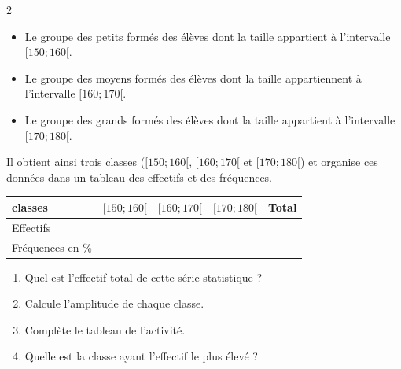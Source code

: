 \begin{multicols*}{2}
 	\begin{itemize}
 		\item Le groupe des petits formés des élèves dont la taille appartient à l'intervalle $[150; 160[$.
 		\item Le groupe des moyens formés des élèves dont la taille appartiennent à l'intervalle $[160; 170[$.
 		\item Le groupe des grands formés des élèves dont la taille appartient à l'intervalle $[170; 180[$.
 	\end{itemize}Il obtient ainsi trois classes ($[150; 160[$, $[160; 170[$ et $[170; 180[$) et organise ces données dans un tableau des effectifs et des fréquences.\\
 	\renewcommand{\arraystretch}{1.5}
 	
 	\hspace*{-1cm}\begin{tabular}{|p{1.7cm}|c|c|c|c|}
 		\hline
 		classes & $[150; 160[$ & $[160;170[$ & $[170; 180[$ & Total \\ \hline
 		Effectifs & & & & \\ \hline
 		Fréquences en \% & & & & \\ 
 		\hline
 	\end{tabular}
 	
 	\begin{enumerate}
 		\item Quel est l'effectif total de cette série statistique ? 
 		\item Calcule l'amplitude de chaque classe.
 		\item Complète le tableau de l'activité.
 		\item Quelle est la classe ayant l'effectif le plus élevé ?
 	\end{enumerate}
 	\dures
 	 
 	

\end{multicols*}
